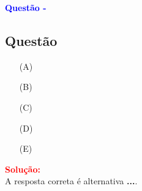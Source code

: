 \begin{flushleft}
\textbf{\textcolor{blue}{\Large Quest\~ao - }}\\
\noindent

\subsection{Quest\~ao }

\begin{itemize}
\item[(A)] 
\item[(B)] 
\item[(C)]
\item[(D)] 
\item[(E)] 
\end{itemize}

\vspace{0.5cm}

\textcolor{red}{\textbf{Solução:}}\\


A resposta correta é alternativa \colorbox{green!50}{\textbf{...}}.

\end{flushleft}





